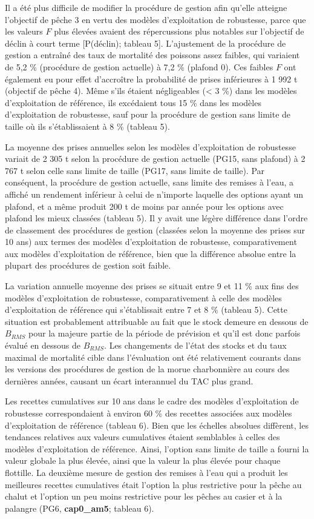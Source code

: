 \documentclass[11pt]{book}
\begin{document}
Il a été plus difficile de modifier la procédure de gestion afin qu'elle atteigne l'objectif de pêche 3 en vertu des modèles d'exploitation de robustesse, parce que les valeurs \(F\) plus élevées avaient des répercussions plus notables sur l'objectif de déclin à court terme {[}P(déclin); tableau 5{]}. L'ajustement de la procédure de gestion a entraîné des taux de mortalité des poissons assez faibles, qui variaient de 5,2 \% (procédure de gestion actuelle) à 7,2 \% (plafond 0). Ces faibles \(F\) ont également eu pour effet d'accroître la probabilité de prises inférieures à 1 992 t (objectif de pêche 4). Même s'ils étaient négligeables (\textless{} 3 \%) dans les modèles d'exploitation de référence, ils excédaient tous 15 \% dans les modèles d'exploitation de robustesse, sauf pour la procédure de gestion sans limite de taille où ils s'établissaient à 8 \% (tableau 5).

La moyenne des prises annuelles selon les modèles d'exploitation de robustesse variait de 2 305 t selon la procédure de gestion actuelle (PG15, sans plafond) à 2 767 t selon celle sans limite de taille (PG17, sans limite de taille). Par conséquent, la procédure de gestion actuelle, sans limite des remises à l'eau, a affiché un rendement inférieur à celui de n'importe laquelle des options ayant un plafond, et a même produit 200 t de moins par année pour les options avec plafond les mieux classées (tableau 5). Il y avait une légère différence dans l'ordre de classement des procédures de gestion (classées selon la moyenne des prises sur 10 ans) aux termes des modèles d'exploitation de robustesse, comparativement aux modèles d'exploitation de référence, bien que la différence absolue entre la plupart des procédures de gestion soit faible.

La variation annuelle moyenne des prises se situait entre 9 et 11 \% aux fins des modèles d'exploitation de robustesse, comparativement à celle des modèles d'exploitation de référence qui s'établissait entre 7 et 8 \% (tableau 5). Cette situation est probablement attribuable au fait que le stock demeure en dessous de \(B_{RMS}\) pour la majeure partie de la période de prévision et qu'il est donc parfois évalué en dessous de \(B_{RMS}\). Les changements de l'état des stocks et du taux maximal de mortalité cible dans l'évaluation ont été relativement courants dans les versions des procédures de gestion de la morue charbonnière au cours des dernières années, causant un écart interannuel du TAC plus grand.

Les recettes cumulatives sur 10 ans dans le cadre des modèles d'exploitation de robustesse correspondaient à environ 60 \% des recettes associées aux modèles d'exploitation de référence (tableau 6). Bien que les échelles absolues diffèrent, les tendances relatives aux valeurs cumulatives étaient semblables à celles des modèles d'exploitation de référence. Ainsi, l'option sans limite de taille a fourni la valeur globale la plus élevée, ainsi que la valeur la plus élevée pour chaque flottille. La deuxième mesure de gestion des remises à l'eau qui a produit les meilleures recettes cumulatives était l'option la plus restrictive pour la pêche au chalut et l'option un peu moins restrictive pour les pêches au casier et à la palangre (PG6, \textbf{cap0\_am5}; tableau 6).
\end{document}
